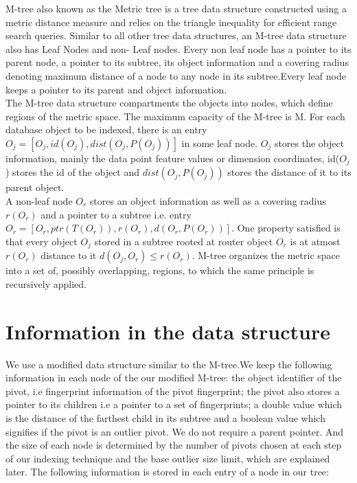 

M-tree also known as the Metric tree is a tree data structure constructed using a metric distance measure and relies on the triangle inequality for efficient range search queries. Similar to all other tree data structures, an M-tree data structure also has Leaf Nodes and non- Leaf nodes. Every non leaf node has a pointer to its parent node, a pointer to its subtree, its object information and a covering radius denoting maximum distance of a node to any node in its subtree.Every leaf node keeps a pointer to its parent and object information.\\

The M-tree data structure compartments the objects into nodes, which define regions of the metric space. The maximum capacity of the M-tree is M. For each database object to be indexed, there is an entry $O_j = [ O_j, id(O_j), dist(O_j , P(O_j )) ]$
in some leaf node.  $O_j$ stores the object information, mainly the data point feature values or dimension coordinates, id($O_j$) stores the id of the object and $dist(O_j , P(O_j ))$ stores the distance of it to its parent object. \\

A non-leaf node $O_r$ stores an object information as well as a covering radius $r(O_r)$ and a pointer to a subtree i.e. entry $O_r=[ O_r, ptr(T(O_r)), r(O_r), d(O_r, P(O_r)) ]$. One property satisfied is that every object $O_j$ stored in a subtree rooted at router object $O_r$ is at atmost $r(O_r)$ distance to it $d(O_j , O_r) ≤ r(O_r)$. M-tree organizes the metric space into a set of, possibly overlapping, regions, to which the same principle is recursively applied.\\


\section{Information in the data structure}

We use a modified data structure similar to the M-tree.We keep the following information in each node of the our modified M-tree: the object identifier of the pivot, i.e fingerprint information of the pivot fingerprint; the pivot also stores a pointer to its children i.e a pointer to a set of fingerprints; a double value which is the distance of the farthest child in its subtree and a boolean value which signifies if the pivot is an outlier pivot. We do not require a parent pointer. And the size of each node is determined by the number of pivots chosen at each step of our indexing technique and the base outlier size limit, which are explained later. The following information is stored in each entry of a node in our tree:

